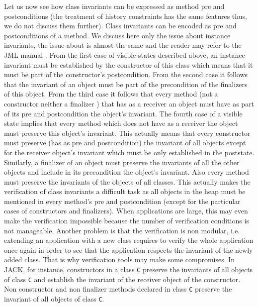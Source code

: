         Let us now see how  class invariants   can be expressed as 
	method pre and postconditions (the treatment of history constraints has the same features thus, we do not discuss them further).
        Class invariants can be encoded as pre and postconditions of a method. We discuss here only the issue about 
	instance invariants, the issue about is almost the same and the reader may refer to the JML manual \cite{JMLRefMan}.
	From the first case of visible states described above, an instance invariant  must
	be established by the constructor of this class which means that it must be part of the constructor's postcondition. 
	From the  second case it follows that the invariant of an object must be part of the precondition of the finalizers of this object.
	From the third case it follows that every method (not a constructor neither a finalizer ) that has as a receiver an object
	must have as part of its pre and postcondition the object's invariant. The fourth case of a visible state implies that every method which does not have
	as a receiver the object must preserve this object's invariant.
	This actually means that every constructor must preserve  (has as pre and postcondition)  the invariant of
	all objects except for the receiver object's invariant which must be only established
	in the poststate. Similarly, a finalizer of an object must preserve the invariants of all the other objects and include in its precondition 
	the object's invariant. Also every method must preserve
	the invariants of the objects of all classes.
	This actually makes the verification of class invariants a difficult task as all objects in 
	the heap must be mentioned in every method's pre and postcondition (except for the particular cases of constructors and finalizers).  
	When applications are large, this may even make the verification impossible because the number of verification conditions is not manageable.
	Another problem is that the verification is non modular, i.e. extending an application with a new class requires to verify the whole application once again 
	in order to see that the application respects the invariant of the newly added class.
	That is why verification tools may make some compromises.  
	In JACK, for instance, constructors in a class \texttt{C} preserve the invariants of all objects of class \texttt{C} and establish the invariant of the receiver
	object of the constructor. Non constructor and non finalizer methods declared in class \texttt{C} preserve the invariant of all objects of class \texttt{C}.   
	 
